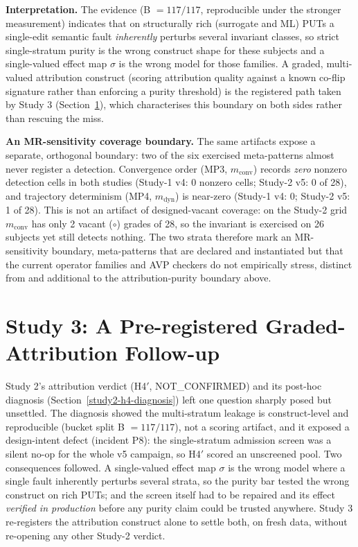 \documentclass[manuscript,screen,review]{acmart}
\begin{document}
\textbf{Interpretation.} The evidence (B \(=117/117\), reproducible under the
stronger measurement) indicates that on structurally rich (surrogate and ML)
PUTs a single-edit semantic fault \emph{inherently} perturbs several invariant
classes, so strict single-stratum purity is the wrong construct shape for
these subjects and a single-valued effect map \(\sigma\) is the wrong model
for those families. A graded, multi-valued attribution construct (scoring
attribution quality against a known co-flip signature rather than enforcing a
purity threshold) is the registered path taken by Study 3
(Section~\ref{study3-attribution-boundary}), which characterises this boundary
on both sides rather than rescuing the miss.

\textbf{An MR-sensitivity coverage boundary.} The same artifacts expose a
separate, orthogonal boundary: two of the six exercised meta-patterns almost
never register a detection. Convergence order (MP3, \(m_{\mathrm{conv}}\))
records \emph{zero} nonzero detection cells in both studies (Study-1 v4: 0
nonzero cells; Study-2 v5: 0 of 28), and trajectory determinism (MP4,
\(m_{\mathrm{dyn}}\)) is near-zero (Study-1 v4: 0; Study-2 v5: 1 of 28). This
is not an artifact of designed-vacant coverage: on the Study-2 grid
\(m_{\mathrm{conv}}\) has only 2 vacant (\(\circ\)) grades of 28, so the
invariant is exercised on 26 subjects yet still detects nothing. The two
strata therefore mark an MR-sensitivity boundary, meta-patterns that are
declared and instantiated but that the current operator families and AVP
checkers do not empirically stress, distinct from and additional to the
attribution-purity boundary above.

\section{Study 3: A Pre-registered Graded-Attribution Follow-up}\label{study3-attribution-boundary}

Study 2's attribution verdict (H4\('\), NOT\_CONFIRMED) and its post-hoc
diagnosis (Section~\ref{study2-h4-diagnosis}) left one question sharply posed
but unsettled. The diagnosis showed the multi-stratum leakage is
construct-level and reproducible (bucket split B \(=117/117\)), not a scoring
artifact, and it exposed a design-intent defect (incident P8): the
single-stratum admission screen was a silent no-op for the whole v5 campaign,
so H4\('\) scored an unscreened pool. Two consequences followed. A single-valued
effect map \(\sigma\) is the wrong model where a single fault inherently
perturbs several strata, so the purity bar tested the wrong construct on rich
PUTs; and the screen itself had to be repaired and its effect \emph{verified in
production} before any purity claim could be trusted anywhere. Study 3
re-registers the attribution construct alone to settle both, on fresh data,
without re-opening any other Study-2 verdict.
\end{document}
